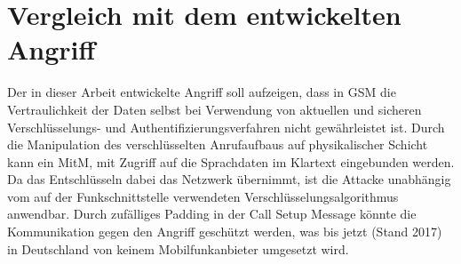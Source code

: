 \section{Vergleich mit dem entwickelten Angriff}
Der in dieser Arbeit entwickelte Angriff soll aufzeigen, dass in GSM die Vertraulichkeit der Daten selbst bei Verwendung von aktuellen und sicheren Verschlüsselungs- und Authentifizierungsverfahren nicht gewährleistet ist. Durch die Manipulation des verschlüsselten Anrufaufbaus auf physikalischer Schicht kann ein \ac{MitM}, mit Zugriff auf die Sprachdaten im Klartext eingebunden werden. Da das Entschlüsseln dabei das Netzwerk übernimmt, ist die Attacke unabhängig vom auf der Funkschnittstelle verwendeten Verschlüsselungsalgorithmus anwendbar. Durch zufälliges Padding in der Call Setup Message könnte die Kommunikation gegen den Angriff geschützt werden, was bis jetzt (Stand 2017) in Deutschland von keinem Mobilfunkanbieter umgesetzt wird.\\ 

